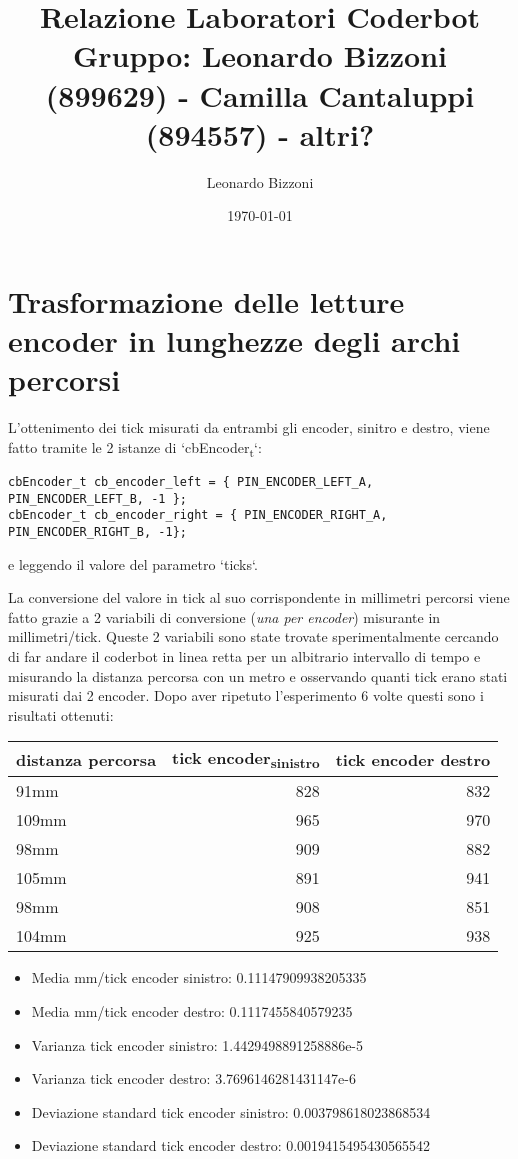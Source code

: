 \documentclass[11pt]{article}
\author{Leonardo Bizzoni}
\date{\today}
\title{Relazione Laboratori Coderbot\\\medskip
\large Gruppo: Leonardo Bizzoni (899629) - Camilla Cantaluppi (894557) - altri?}
\begin{document}
\maketitle
\tableofcontents

\section{Trasformazione delle letture encoder in lunghezze degli archi percorsi}
\label{sec:orgcf6fb9b}
L'ottenimento dei tick misurati da entrambi gli encoder, sinitro e destro, viene fatto tramite le 2 istanze di `cbEncoder\textsubscript{t}`:
\begin{verbatim}
cbEncoder_t cb_encoder_left = { PIN_ENCODER_LEFT_A, PIN_ENCODER_LEFT_B, -1 };
cbEncoder_t cb_encoder_right = { PIN_ENCODER_RIGHT_A, PIN_ENCODER_RIGHT_B, -1};
\end{verbatim}
e leggendo il valore del parametro `ticks`.

La conversione del valore in tick al suo corrispondente in millimetri percorsi viene fatto grazie a 2 variabili di conversione (\emph{una per encoder}) misurante in millimetri/tick.
Queste 2 variabili sono state trovate sperimentalmente cercando di far andare il coderbot in linea retta per un albitrario intervallo di tempo e misurando la distanza percorsa con un metro e osservando quanti tick erano stati misurati dai 2 encoder. Dopo aver ripetuto l'esperimento 6 volte questi sono i risultati ottenuti:
\begin{center}
\begin{tabular}{lrr}
distanza percorsa & tick encoder\textsubscript{sinistro} & tick encoder destro\\
\hline
91mm & 828 & 832\\
109mm & 965 & 970\\
98mm & 909 & 882\\
105mm & 891 & 941\\
98mm & 908 & 851\\
104mm & 925 & 938\\
\end{tabular}
\end{center}

\begin{itemize}
\item Media mm/tick encoder sinistro:            0.11147909938205335
\item Media mm/tick encoder destro:              0.1117455840579235
\item Varianza tick encoder sinistro:            1.4429498891258886e-5
\item Varianza tick encoder destro:              3.7696146281431147e-6
\item Deviazione standard tick encoder sinistro: 0.003798618023868534
\item Deviazione standard tick encoder destro:   0.0019415495430565542
\end{itemize}
\end{document}
